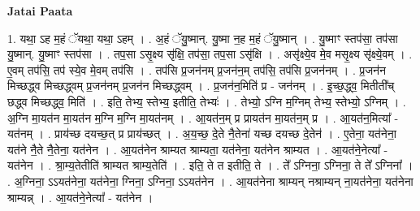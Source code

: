 \documentclass[17pt]{extarticle}
\begin{document}
\textbf{Jatai Paata} \newline

1. यथा॒ ऽह म॒हं ॅयथा॒ यथा॒ ऽहम् । . अ॒हं ॅयु॒ष्मान्. यु॒ष्मा न॒ह म॒हं ॅयु॒ष्मान् । . यु॒ष्माꣳ स्तप॑सा॒ तप॑सा यु॒ष्मान्. यु॒ष्माꣳ स्तप॑सा । . तप॒सा ऽसृ॒क्ष्य सृ॑क्षि॒ तप॑सा॒ तप॒सा ऽसृ॑क्षि । . असृ॑क्ष्ये॒व मे॒व मसृ॒क्ष्य सृ॑क्ष्ये॒वम् । . ए॒वम् तप॑सि॒ तप॑ स्ये॒व मे॒वम् तप॑सि । . तप॑सि प्र॒जन॑नम् प्र॒जन॑न॒म् तप॑सि॒ तप॑सि प्र॒जन॑नम् । . प्र॒जन॑न मिच्छद्ध्व मिच्छद्ध्वम् प्र॒जन॑नम् प्र॒जन॑न मिच्छद्ध्वम् । . प्र॒जन॑न॒मिति॑ प्र - जन॑नम् । . इ॒च्छ॒द्ध्व॒ मितीती᳚च् छद्ध्व मिच्छद्ध्व॒ मिति॑ । . इति॒ तेभ्य॒ स्तेभ्य॒ इतीति॒ तेभ्यः॑ । . तेभ्यो॒ ऽग्नि म॒ग्निम् तेभ्य॒ स्तेभ्यो॒ ऽग्निम् । . अ॒ग्नि मा॒यत॑न मा॒यत॑न म॒ग्नि म॒ग्नि मा॒यत॑नम् । . आ॒यत॑न॒म् प्र प्रायत॑न मा॒यत॑न॒म् प्र । . आ॒यत॑न॒मित्या᳚ - यत॑नम् । . प्राय॑च्छ दयच्छ॒त् प्र प्राय॑च्छत् । . अ॒य॒च्छ॒ दे॒ते नै॒तेना॑ यच्छ दयच्छ दे॒तेन॑ । . ए॒तेना॒ यत॑नेना॒ यत॑ने नै॒ते नै॒तेना॒ यत॑नेन । . आ॒यत॑नेन श्राम्यत श्राम्यता॒ यत॑नेना॒ यत॑नेन श्राम्यत । . आ॒यत॑ने॒नेत्या᳚ - यत॑नेन । . श्रा॒म्य॒तेतीति॑ श्राम्यत श्राम्य॒तेति॑ । . इति॒ ते त इतीति॒ ते । . ते᳚ ऽग्निना॒ ऽग्निना॒ ते ते᳚ ऽग्निना᳚ । . अ॒ग्निना॒ ऽऽयत॑नेना॒ यत॑नेना॒ ग्निना॒ ऽग्निना॒ ऽऽयत॑नेन । . आ॒यत॑नेना श्राम्यन् नश्राम्यन् ना॒यत॑नेना॒ यत॑नेना श्राम्यन्न् । . आ॒यत॑ने॒नेत्या᳚ - यत॑नेन । \newline
\end{document}
